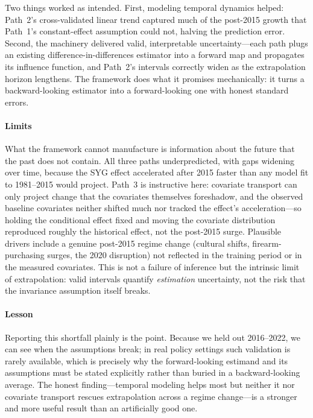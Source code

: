 \documentclass{article}
\begin{document}
Two things worked as intended. First, modeling temporal dynamics helped: Path~2's cross-validated linear trend captured much of the post-2015 growth that Path~1's constant-effect assumption could not, halving the prediction error. Second, the machinery delivered valid, interpretable uncertainty---each path plugs an existing difference-in-differences estimator into a forward map and propagates its influence function, and Path~2's intervals correctly widen as the extrapolation horizon lengthens. The framework does what it promises mechanically: it turns a backward-looking estimator into a forward-looking one with honest standard errors.

\paragraph{Limits}

What the framework cannot manufacture is information about the future that the past does not contain. All three paths underpredicted, with gaps widening over time, because the SYG effect accelerated after 2015 faster than any model fit to 1981--2015 would project. Path~3 is instructive here: covariate transport can only project change that the covariates themselves foreshadow, and the observed baseline covariates neither shifted much nor tracked the effect's acceleration---so holding the conditional effect fixed and moving the covariate distribution reproduced roughly the historical effect, not the post-2015 surge. Plausible drivers include a genuine post-2015 regime change (cultural shifts, firearm-purchasing surges, the 2020 disruption) not reflected in the training period or in the measured covariates. This is not a failure of inference but the intrinsic limit of extrapolation: valid intervals quantify \emph{estimation} uncertainty, not the risk that the invariance assumption itself breaks.

\paragraph{Lesson}

Reporting this shortfall plainly is the point. Because we held out 2016--2022, we can see when the assumptions break; in real policy settings such validation is rarely available, which is precisely why the forward-looking estimand and its assumptions must be stated explicitly rather than buried in a backward-looking average. The honest finding---temporal modeling helps most but neither it nor covariate transport rescues extrapolation across a regime change---is a stronger and more useful result than an artificially good one.
\end{document}
